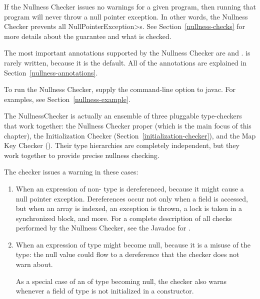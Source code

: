\htmlhr
{}

If the Nullness Checker issues no warnings for a given program, then
running that program will never throw a null pointer exception.  In
other words, the Nullness Checker prevents all \<NullPointerException>s.
See Section~\ref{nullness-checks} for more details about
the guarantee and what is checked.

The most important annotations supported by the Nullness Checker are
 and
.
 is rarely written, because it is
the default.  All of the annotations are explained in
Section~\ref{nullness-annotations}.

To run the Nullness Checker, supply the
command-line option to javac.  For
examples, see Section~\ref{nullness-example}.

The NullnessChecker is actually an ensemble of three pluggable
type-checkers that work together: the Nullness Checker proper (which is the
main focus of this chapter), the Initialization Checker
(Section~\ref{initialization-checker}), and the Map Key Checker
().
Their type hierarchies are completely independent, but they work together
to provide precise nullness checking.



The checker issues a warning in these cases:

\begin{enumerate}

\item
  When an expression of non- type
  is dereferenced, because it might cause a null pointer exception.
  Dereferences occur not only when a field is accessed, but when an array
  is indexed, an exception is thrown, a lock is taken in a synchronized
  block, and more.  For a complete description of all checks performed by
  the Nullness Checker, see the Javadoc for
  .

\item
  When an expression of  type
  might become null, because it
  is a misuse of the type:  the null value could flow to a dereference that
  the checker does not warn about.

  As a special case of an of 
  type becoming null, the checker also warns whenever a field of
   type is not initialized in a
  constructor.

\end{enumerate}

